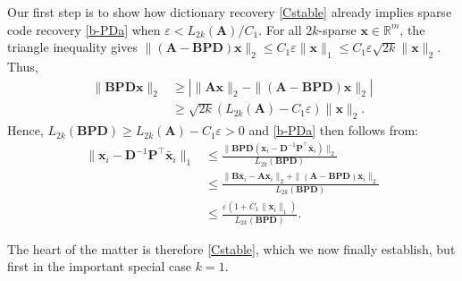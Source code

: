 \documentclass[9pt,twocolumn]{pnas-new}
\begin{document}
Our first step is to show how dictionary recovery \eqref{Cstable} already implies sparse code recovery \eqref{b-PDa} when $\varepsilon < L_{2k}(\mathbf{A}) / C_1$. For all $2k$-sparse $\mathbf{x} \in \mathbb{R}^m$, the triangle inequality gives \mbox{$\|(\mathbf{A}-\mathbf{BPD})\mathbf{x}\|_2  \leq C_1\varepsilon \|\mathbf{x}\|_1 \leq C_1 \varepsilon \sqrt{2k}  \|\mathbf{x}\|_2$}. Thus, 
\begin{align*}
\|\mathbf{BPD}\mathbf{x}\|_2 
&\geq | \|\mathbf{A}\mathbf{x}\|_2 - \|(\mathbf{A}-\mathbf{BPD})\mathbf{x}\|_2 | \\
&\geq \sqrt{2k} (L_{2k}(\mathbf{A}) -  C_1\varepsilon) \|\mathbf{x}\|_2.
\end{align*}
%
Hence, $L_{2k}(\mathbf{BPD}) \geq L_{2k}(\mathbf{A}) - C_1\varepsilon  > 0$ and \eqref{b-PDa} then follows from:
\begin{align*}
\|\mathbf{x}_i - \mathbf{D}^{-1}\mathbf{P}^{\top}\mathbf{\bar x}_i \|_1
&\leq \frac{\|\mathbf{BPD}(\mathbf{x}_i - \mathbf{D}^{-1}\mathbf{P}^{\top}\mathbf{\bar x}_i)\|_2}{L_{2k}(\mathbf{BPD})} \\
&\leq \frac{\|\mathbf{B}\mathbf{\bar x}_i - \mathbf{A}\mathbf{x}_i\|_2 + \|(\mathbf{A} - \mathbf{BPD})\mathbf{x}_i\|_2}{L_{2k}(\mathbf{BPD})} \\
&\leq \frac{\varepsilon (1+C_1 \|\mathbf{x}_i\|_1)}{L_{2k}(\mathbf{BPD})}.
\end{align*}

The heart of the matter is therefore \eqref{Cstable}, which we now finally establish, but first in the important special case $k = 1$.

\end{document}
